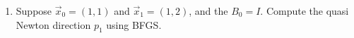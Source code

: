 \documentclass[a4paper,10pt]{article}
\begin{document}
\begin{enumerate}
\begin{enumerate}
{\color{blue} 
\begin{CJK*}{UTF8}{bsmi}
這邊將-2的位置改成+2，使其 diagonal 為正值
$$\hat{H}=L\hat{D}L^T=\begin{bmatrix}
1&0\\-3&1
\end{bmatrix}
\begin{bmatrix}
2&0\\0&12
\end{bmatrix}
\begin{bmatrix}
1&-3\\0&1
\end{bmatrix}=
\begin{bmatrix}
2&-6\\-6&30
\end{bmatrix}$$
$$\vec{p}=-\hat{H}^{-1}\vec{g}=
-\begin{bmatrix}
\frac{5}{4}&\frac{1}{4}\\\frac{1}{4}&\frac{1}{12}
\end{bmatrix}
\begin{bmatrix}
3\\-3
\end{bmatrix}=
\begin{bmatrix}
-3\\-\frac{1}{2}
\end{bmatrix}$$
\end{CJK*}

}
    \item Suppose $\vec{x}_0=(1,1)$ and $\vec{x}_{1}=(1,2)$, and the $B_0=I$. Compute the quasi Newton direction $p_1$ using BFGS.


\end{enumerate}
\end{enumerate}
\end{document}
